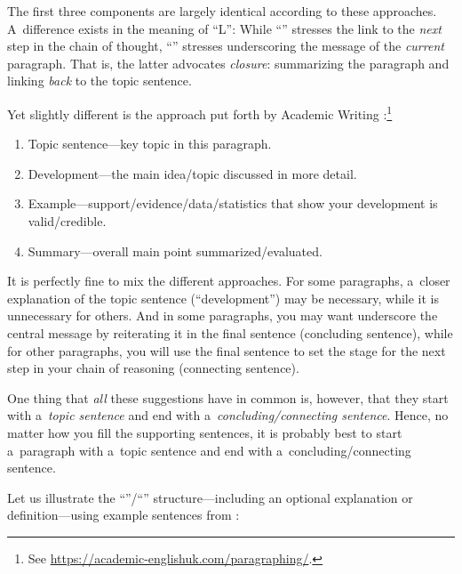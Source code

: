 The first three components are largely identical according to these approaches. A~difference exists in the meaning of ``L'': While ``'' stresses the link to the \emph{next} step in the chain of thought, ``'' stresses underscoring the message of the \emph{current} paragraph. That is, the latter advocates \emph{closure}: summarizing the paragraph and linking \emph{back} to the topic sentence.
\pagebreak

Yet slightly different is the approach put forth by Academic Writing :\footnote{See \url{https://academic-englishuk.com/paragraphing/}.}\par\nopagebreak
\begin{enumerate}
	\item Topic sentence---key topic in this paragraph.
	\item Development---the main idea\slash topic discussed in more detail.
	\item Example---support\slash evidence\slash data\slash statistics that show your development is valid\slash credible.
	\item Summary---overall main point summarized\slash evaluated.
\end{enumerate}

It is perfectly fine to mix the different approaches. For some paragraphs, a~closer explanation of the topic sentence (``development'') may be necessary, while it is unnecessary for others. And in some paragraphs, you may want underscore the central message by reiterating it in the final sentence (concluding sentence), while for other paragraphs, you will use the final sentence to set the stage for the next step in your chain of reasoning (connecting sentence).

One thing that \emph{all} these suggestions have in common is, however, that they start with a~\emph{topic sentence} and end with a~\emph{concluding\slash connecting sentence}. Hence, no matter how you fill the supporting sentences, it is probably best to start a~paragraph with a~topic sentence and end with a~concluding\slash connecting sentence.

Let us illustrate the ``''\slash``'' structure---including an optional explanation or definition---using example sentences from \citet{sigfridsson}:

